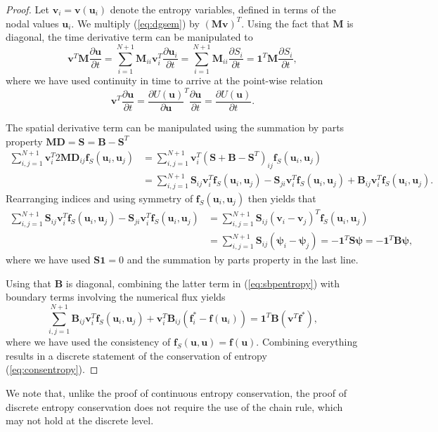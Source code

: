 \documentclass[preprint,10pt]{article}
\theoremstyle{definition}
\theoremstyle{lemma}
\theoremstyle{theorem}
\theoremstyle{assumption}
\newcommand{\pd}[2]{\frac{\partial#1}{\partial#2}}
\newcommand{\LRp}[1]{\left( #1 \right)}
\begin{document}
\begin{proof}
Let $\bm{v}_i = \bm{v}(\bm{u}_i)$ denote the entropy variables, defined in terms of the nodal values $\bm{u}_i$.  We multiply (\ref{eq:dgsem}) by $\LRp{\bm{M}\bm{v}}^T$.  
Using the fact that $\bm{M}$ is diagonal, the time derivative term can be manipulated to 
\[
\bm{v}^T\bm{M}\pd{\bm{u}}{t} = \sum_{i=1}^{N+1} \bm{M}_{ii} \bm{v}_i^T \pd{\bm{u}_i}{t} = \sum_{i=1}^{N+1} \bm{M}_{ii} \pd{S_i}{t} = \bm{1}^T\bm{M}\pd{S_i}{t},
\]
where we have used continuity in time to arrive at the point-wise relation 
\[
\bm{v}^T \pd{\bm{u}}{t} = \pd{U(\bm{u})}{\bm{u}}^T \pd{\bm{u}}{t} = \pd{U(\bm{u})}{t}.
\]

The spatial derivative term can be manipulated using the summation by parts property $\bm{M}\bm{D} = \bm{S} = \bm{B}-\bm{S}^T$
\begin{align}
\sum_{i,j=1}^{N+1} \bm{v}_i^T 2 \bm{M}\bm{D}_{ij}\bm{f}_S(\bm{u}_i,\bm{u}_j) &= \sum_{i,j=1}^{N+1} \bm{v}_i^T (\bm{S} + \bm{B} - \bm{S}^T)_{ij}\bm{f}_S(\bm{u}_i,\bm{u}_j) \nonumber\\
&= \sum_{i,j=1}^{N+1} \bm{S}_{ij}\bm{v}_i^T \bm{f}_S(\bm{u}_i,\bm{u}_j) - \bm{S}_{ji}\bm{v}_i^T \bm{f}_S(\bm{u}_i,\bm{u}_j) + \bm{B}_{ij}\bm{v}_i^T \bm{f}_S(\bm{u}_i,\bm{u}_j). \label{eq:sbpentropy}
\end{align}
Rearranging indices and using symmetry of $\bm{f}_S(\bm{u}_i,\bm{u}_j)$ then yields that
\begin{align*}
\sum_{i,j=1}^{N+1} \bm{S}_{ij}\bm{v}_i^T \bm{f}_S(\bm{u}_i,\bm{u}_j) - \bm{S}_{ji}\bm{v}_i^T \bm{f}_S(\bm{u}_i,\bm{u}_j) &= \sum_{i,j=1}^{N+1} \bm{S}_{ij} \LRp{\bm{v}_i - \bm{v}_j}^T\bm{f}_S(\bm{u}_i,\bm{u}_j)\\
&= \sum_{i,j=1}^{N+1} \bm{S}_{ij} \LRp{\bm{\psi}_i-\bm{\psi}_j} = -\bm{1}^T \bm{S}\bm{\psi} = -\bm{1}^T\bm{B}\bm{\psi},
\end{align*}
where we have used $\bm{S}\bm{1} = 0$ and the summation by parts property in the last line.  

Using that $\bm{B}$ is diagonal, combining the latter term in (\ref{eq:sbpentropy}) with boundary terms involving the numerical flux yields
\[
\sum_{i,j = 1}^{N+1} \bm{B}_{ij}\bm{v}_i^T \bm{f}_S(\bm{u}_i,\bm{u}_j) + \bm{v}_i^T\bm{B}_{ij}\LRp{\bm{f}_i^* - \bm{f}(\bm{u}_i)} = \bm{1}^T\bm{B} \LRp{\bm{v}^T \bm{f}^*},
\]
where we have used the consistency of $\bm{f}_S(\bm{u},\bm{u}) = \bm{f}(\bm{u})$.  Combining everything results in a discrete statement of the conservation of entropy (\ref{eq:consentropy}).   
\end{proof}
We note that, unlike the proof of continuous entropy conservation, the proof of discrete entropy conservation does not require the use of the chain rule, which may not hold at the discrete level.  
\end{document}
